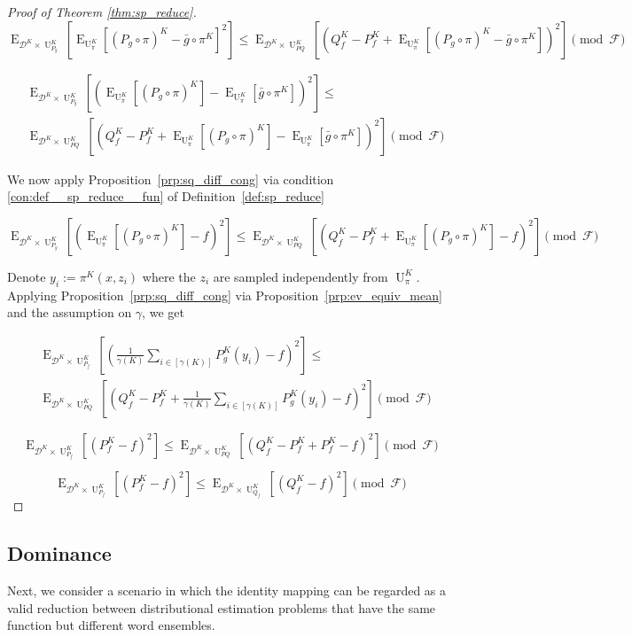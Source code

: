 \documentclass[11pt]{article}
\numberwithin{equation}{section}
\theoremstyle{definition}
\theoremstyle{plain}
\DeclareMathOperator{\E}{E}
\DeclareMathOperator{\Un}{U}
\newcommand{\Dist}{\mathcal{D}}
\newcommand{\Fall}{\mathcal{F}}
\begin{document}
\begin{proof}[Proof of Theorem \ref{thm:sp_reduce}]
\[\E_{\Dist^{K} \times \Un_{P_g}^K}[\E_{\Un_\pi^K}[(P_g \circ \pi)^K-\bar{g} \circ \pi^K]^2] \leq \E_{\Dist^{K} \times \Un_{PQ}^K} [(Q_f ^K - P_f^K+\E_{\Un_\pi^K}[(P_g \circ \pi)^K - \bar{g} \circ \pi^K])^2] \pmod \Fall\]

\begin{align*}
&\E_{\Dist^{K} \times \Un_{P_g}^K}[(\E_{\Un_\pi^K}[(P_g \circ \pi)^K]-\E_{\Un_\pi^K}[\bar{g} \circ \pi^K])^2] \leq\\ 
&\E_{\Dist^{K} \times \Un_{PQ}^K} [(Q_f ^K - P_f^K+\E_{\Un_\pi^K}[(P_g \circ \pi)^K] - \E_{\Un_\pi^K}[\bar{g} \circ \pi^K])^2] \pmod \Fall 
\end{align*}

We now apply Proposition~\ref{prp:sq_diff_cong} via condition \ref{con:def__sp_reduce__fun} of Definition~\ref{def:sp_reduce}

\[\E_{\Dist^{K} \times \Un_{P_g}^K}[(\E_{\Un_\pi^K}[(P_g \circ \pi)^K]-f)^2] \leq \E_{\Dist^{K} \times \Un_{PQ}^K}[(Q_f ^K - P_f^K+\E_{\Un_\pi^K}[(P_g \circ \pi)^K] - f)^2] \pmod \Fall\]

Denote $y_i:=\pi^K(x,z_i)$ where the ${z_i}$ are sampled independently from ${\Un_\pi^K}$. Applying Proposition~\ref{prp:sq_diff_cong} via Proposition~\ref{prp:ev_equiv_mean} and the assumption on $\gamma$, we get

\begin{align*}
&\E_{\Dist^{K} \times \Un_{P_f}^K}\left[\left(\frac{1}{\gamma(K)}\sum_{i \in [\gamma(K)]}P_g^K(y_i)-f\right)^2\right] \leq \\ 
&\E_{\Dist^{K} \times \Un_{PQ}^K}\left[\left(Q_f ^K - P_f^K+\frac{1}{\gamma(K)}\sum_{i \in [\gamma(K)]}P_g^K(y_i) - f\right)^2\right] \pmod \Fall 
\end{align*}

\[\E_{\Dist^{K} \times \Un_{P_f}^K}[(P_f^K-f)^2] \leq \E_{\Dist^{K} \times \Un_{PQ}^K}[(Q_f ^K - P_f^K+P_f^K - f)^2] \pmod \Fall\]

\[\E_{\Dist^{K} \times \Un_{P_f}^K}[(P_f^K-f)^2] \leq \E_{\Dist^{K} \times \Un_{Q_f}^K}[(Q_f ^K - f)^2] \pmod \Fall\]
%
\end{proof}

\subsection{Dominance}

Next, we consider a scenario in which the identity mapping can be regarded as a valid reduction between distributional estimation problems that have the same function but different word ensembles.
\end{document}
